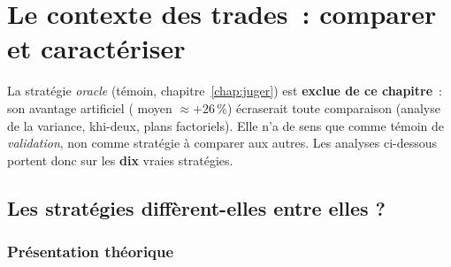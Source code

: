 \chapter{Le contexte des trades~: comparer et caractériser}
\label{chap:contexte}


\begin{limites}
La stratégie \emph{oracle} (témoin, chapitre~\ref{chap:juger}) est
\textbf{exclue de ce chapitre}~: son avantage artificiel
(\edgevar{} moyen $\approx +26\,\%$) écraserait toute comparaison
(analyse de la variance, khi-deux, plans factoriels). Elle n'a de sens
que comme témoin de \emph{validation}, non comme stratégie à comparer aux
autres. Les analyses ci-dessous portent donc sur les \textbf{dix} vraies
stratégies. %
\end{limites}

\section{Les stratégies diffèrent-elles entre elles ?}
\label{sec:b1-etape2}

\subsection{Présentation théorique}
